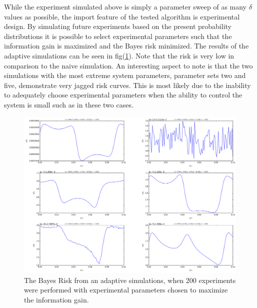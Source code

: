 While the experiment simulated above is simply a parameter sweep of as many $\delta$ values as possible, the import feature of the tested algorithm is experimental design. By simulating future experiments based on the present probability distributions it is possible to select experimental parameters such that the information gain is maximized and the Bayes risk minimized. The results of the adaptive simulations can be seen in fig(\ref{fig:adaptiverisks}). Note that the risk is very low in comparison to the naive simulation. An interesting aspect to note is that the two simulations with the most extreme system parameters, parameter sets two and five, demonstrate very jagged risk curves. This is most likely due to the inability to adequately choose experimental parameters when the ability to control the system is small such as in these two cases. 
\begin{figure}[ht!]
\centering
\includegraphics[width=\textwidth , height=0.8\textheight]{Figures/adaptiverisk.png}
\caption{The Bayes Risk from an adaptive simulations, when 200 experiments were performed with experimental parameters chosen to maximize the information gain.}
\label{fig:adaptiverisks}
\end{figure}

